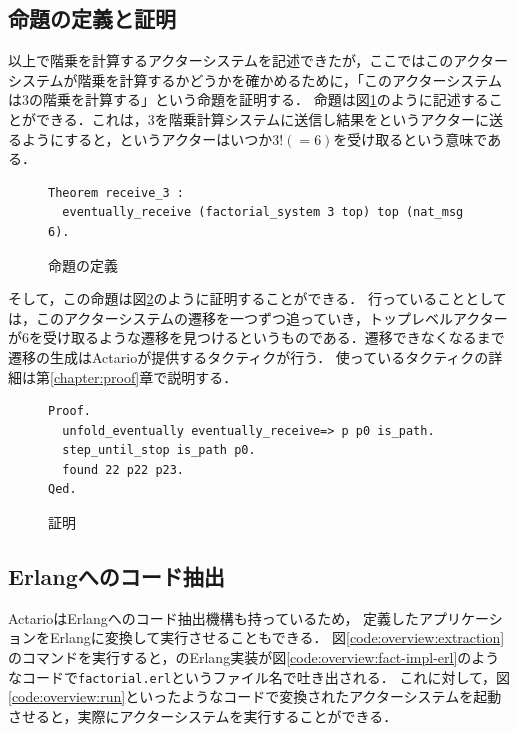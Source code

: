 \subsection{命題の定義と証明}

以上で階乗を計算するアクターシステムを記述できたが，ここではこのアクターシステムが階乗を計算するかどうかを確かめるために，「このアクターシステムは3の階乗を計算する」という命題を証明する．
命題は図\ref{code:overview:fact-spec}のように記述することができる．これは，$3$を階乗計算システムに送信し結果をというアクターに送るようにすると，というアクターはいつか$3! (= 6)$を受け取るという意味である．

\begin{figure}[tp]
\begin{lstlisting}
Theorem receive_3 :
  eventually_receive (factorial_system 3 top) top (nat_msg 6).
\end{lstlisting}
\label{code:overview:fact-spec}
\caption{命題の定義}
\end{figure}

そして，この命題は図\ref{code:overview:fact-proof}のように証明することができる．
行っていることとしては，このアクターシステムの遷移を一つずつ追っていき，トップレベルアクターが$6$を受け取るような遷移を見つけるというものである．遷移できなくなるまで遷移の生成はActarioが提供するタクティクが行う．
使っているタクティクの詳細は第\ref{chapter:proof}章で説明する．

\begin{figure}[tp]
\begin{lstlisting}
Proof.
  unfold_eventually eventually_receive=> p p0 is_path.
  step_until_stop is_path p0.
  found 22 p22 p23.
Qed.
\end{lstlisting}
  \label{code:overview:fact-proof}
  \caption{証明}
\end{figure}


\subsection{Erlangへのコード抽出}

ActarioはErlangへのコード抽出機構も持っているため，
定義したアプリケーションをErlangに変換して実行させることもできる．
図\ref{code:overview:extraction}のコマンドを実行すると，のErlang実装が図\ref{code:overview:fact-impl-erl}のようなコードで\texttt{factorial.erl}というファイル名で吐き出される．
これに対して，図\ref{code:overview:run}といったようなコードで変換されたアクターシステムを起動させると，実際にアクターシステムを実行することができる．

